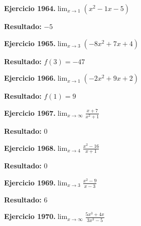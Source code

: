 \documentclass[10pt,a4paper]{article}
\begin{document}
\begin{ejbox}
\textbf{Ejercicio 1964.}\quad $\lim_{x\to 1} (x^2 -1x -5)$
\end{ejbox}

\begin{solbox}
\textbf{Resultado:} \(\displaystyle -5\)
\end{solbox}

\begin{ejbox}
\textbf{Ejercicio 1965.}\quad $\lim_{x\to 3} (-8x^2 +7x +4)$
\end{ejbox}

\begin{solbox}
\textbf{Resultado:} \(\displaystyle f(3) = -47\)
\end{solbox}

\newpage
\begin{ejbox}
\textbf{Ejercicio 1966.}\quad $\lim_{x\to 1} (-2x^2 +9x +2)$
\end{ejbox}

\begin{solbox}
\textbf{Resultado:} \(\displaystyle f(1) = 9\)
\end{solbox}

\begin{ejbox}
\textbf{Ejercicio 1967.}\quad $\lim_{x\to \infty} \frac{x + 7}{x^2 + 1}$
\end{ejbox}

\begin{solbox}
\textbf{Resultado:} \(\displaystyle 0\)
\end{solbox}

\begin{ejbox}
\textbf{Ejercicio 1968.}\quad $\lim_{x\to 4} \frac{x^2-16}{x+1}$
\end{ejbox}

\begin{solbox}
\textbf{Resultado:} \(\displaystyle 0\)
\end{solbox}

\newpage
\begin{ejbox}
\textbf{Ejercicio 1969.}\quad $\lim_{x\to 3} \frac{x^2-9}{x-3}$
\end{ejbox}

\begin{solbox}
\textbf{Resultado:} \(\displaystyle 6\)
\end{solbox}

\begin{ejbox}
\textbf{Ejercicio 1970.}\quad $\lim_{x\to \infty} \frac{5x^3 + 4x}{3x^3 - 5}$
\end{ejbox}
\end{document}
